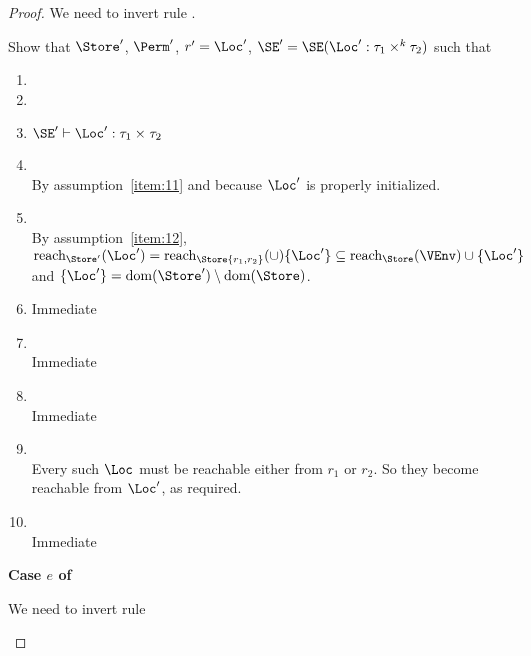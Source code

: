 \begin{proof}
  We need to invert rule .
  \begin{mathpar}
  \end{mathpar}
  Show that $\Store'$, $\Perm'$, $r' = \Loc'$, $\SE' = \SE (\Loc' : \tyPair[k]{\tau_1}{\tau_2})$ such that
  \begin{enumerate}[({R}1)]
  \item {}
  \item {}
  \item $\SE' \vdash \Loc' : \tyPair{\tau_1}{\tau_2}$
  \item {}
    \\ By assumption~\ref{item:11} and because $\Loc'$ is properly initialized.
  \item {}
    \\ By assumption~\ref{item:12}, $\Reach{\Store'}{\Loc'} =
    \Reach\Store{r_1, r_2} \cup \{\Loc'\} \subseteq
    \Reach{\Store}\VEnv \cup \{\Loc'\}$ and $\{\Loc'\} = \Dom{\Store'}
    \setminus \Dom\Store$.
  \item {}
    Immediate
  \item {}
    \\ Immediate
  \item {}
    \\ Immediate
  \item {}
    \\ Every such $\Loc$ must be reachable either from $r_1$ or
    $r_2$. So they become reachable from $\Loc'$, as required.
  \item {}
    \\ Immediate
  \end{enumerate}

  \newpage
  \textbf{Case $e$ of}

  We need to invert rule 
  \begin{mathpar}
  \end{mathpar}


\end{proof}
